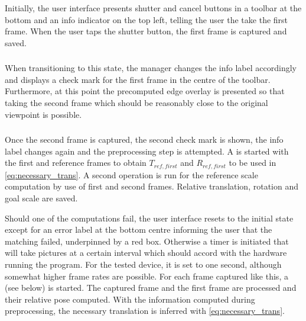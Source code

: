 \subsubsection*{}

Initially, the user interface presents shutter and cancel buttons in a toolbar
at the bottom and an info indicator on the top left, telling the user the take
the first frame. When the user taps the shutter button, the first frame is
captured and saved.

\subsubsection*{}

When transitioning to this state, the manager changes the info label accordingly
and displays a check mark for the first frame in the centre of the toolbar.
Furthermore, at this point the precomputed edge overlay is presented so that
taking the second frame which should be reasonably close to the original
viewpoint is possible.

\subsubsection*{}

Once the second frame is captured, the second check mark is shown, the info
label changes again and the preprocessing step is attempted. A
 is started with the first and reference
frames to obtain $T_{ref,first}$ and $R_{ref,first}$ to be used in
\eqref{eq:necessary_trans}. A second operation is run for the reference scale
computation by use of first and second frames. Relative translation, rotation
and goal scale are saved.

Should one of the computations fail, the user interface resets to the initial
state except for an error label at the bottom centre informing the user that the
matching failed, underpinned by a red box. Otherwise a timer is initiated that
will take pictures at a certain interval which should accord with the hardware
running the program. For the tested device, it is set to one second, although
somewhat higher frame rates are possible. For each frame captured like this, a
 (see below) is started. The captured
frame and the first frame are processed and their relative pose computed. With
the information computed during preprocessing, the necessary translation is
inferred with \eqref{eq:necessary_trans}.

